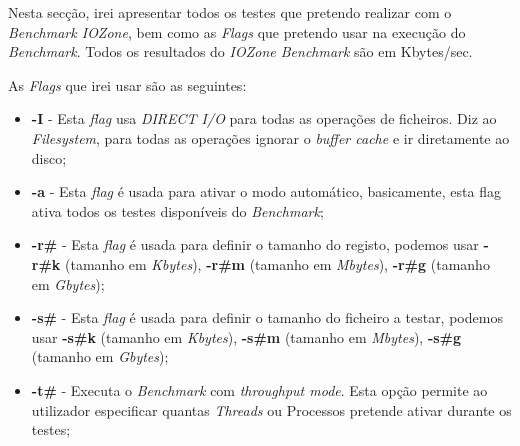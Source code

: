 \documentclass[conference,compsoc]{IEEEtran}
\begin{document}
Nesta secção, irei apresentar todos os testes que pretendo realizar com o \textit{Benchmark IOZone}\cite{iozone_man}, bem como as \textit{Flags} que pretendo usar na execução do \textit{Benchmark}. Todos os resultados do \textit{IOZone Benchmark} são em Kbytes/sec.

As \textit{Flags} que irei usar são as seguintes:
\begin{itemize}
	\item \textbf{-I} - Esta \textit{flag} usa \textit{DIRECT I/O} para todas as operações de ficheiros. Diz ao \textit{Filesystem}, para todas as operações ignorar o \textit{buffer cache} e ir diretamente ao disco;
	\item \textbf{-a} - Esta \textit{flag} é usada para ativar o modo automático, basicamente, esta flag ativa todos os testes disponíveis do \textit{Benchmark};
	\item \textbf{-r\#} - Esta \textit{flag} é usada para definir o tamanho do registo, podemos usar \textbf{-r\#k} (tamanho em \textit{Kbytes}), 	\textbf{-r\#m} (tamanho em \textit{Mbytes}), \textbf{-r\#g} (tamanho em \textit{Gbytes});
	\item \textbf{-s\#} - Esta \textit{flag} é usada para definir o tamanho do ficheiro a testar, podemos usar \textbf{-s\#k} (tamanho em \textit{Kbytes}), 	\textbf{-s\#m} (tamanho em \textit{Mbytes}), \textbf{-s\#g} (tamanho em \textit{Gbytes});
	\item \textbf{-t\#} - Executa o \textit{Benchmark} com \textit{throughput mode}. Esta opção permite ao utilizador especificar quantas \textit{Threads} ou Processos pretende ativar durante os testes;
\end{itemize}
\end{document}

